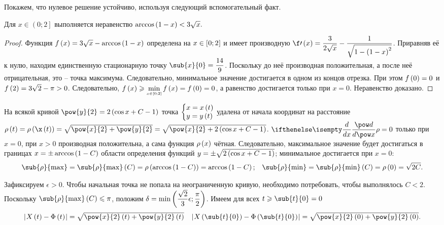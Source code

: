 \documentclass[a5paper,10pt]{article}
\begin{document}
Покажем, что нулевое решение устойчиво, используя следующий вспомогательный факт.

\begin{framed}
Для $x \in \left(0; 2\right]$ выполняется неравенство $\arccos\left(\hspace{0.01em}1 - x\hspace{0.01em}\right) < 3\sqrt{x}.$
\begin{proof}
    Функция $f\left(\hspace{0.01em}x\hspace{0.01em}\right) = 3\sqrt{x} - \arccos\left(\hspace{0.01em}1 - x\hspace{0.01em}\right)$ определена на $x \in \left[\hspace{0.03em}0; 2\hspace{0.03em}\right]$ и
    имеет производную 
    $\f\prime\br{x} = \dfrac {3} {2\sqrt{x}} - \dfrac {1} {\sqrt{1 - \br{1 - x}^2}}$.
    Приравняв её к нулю, находим единственную стационарную точку $\sub{x}{0} = \dfrac {14} {9}$.
    Поскольку до неё производная положительная, а после неё отрицательная,
    это -- точка максимума. Следовательно, минимальное значение достигается в одном из 
    концов отрезка. При этом 
    $f\left(\hspace{0.01em}0\hspace{0.01em}\right) = 0$ и $f\left(\hspace{0.01em}2\hspace{0.01em}\right) = 3\sqrt{2} - \pi > 0$.
    Следовательно, 
    $f\br{x} \ge \displaystyle{\tmin{\mathsmaller{x \in \rbr[0em]{0; 2}}}} {\,f\br{x}} = f\br{0} = 0$,
    а равенство достигается только при $x = 0$. Неравенство доказано.
\end{proof}
\end{framed}

На всякой кривой $\pow{y}{2} = 2\br{\cos x + C - 1}$ точка 
$\tsys{x = x\br{t} \\ y = y\br{t}}$
удалена от начала координат на расстояние 
$\rho\br{t} = \rho\br{\x\br{t}} = \sqrt{\pow{x}{2} + \pow{y}{2}} 
    = \sqrt{\pow{x}{2} + 2\br{\cos{x} + C - 1}}$.
$\der{}{x} \rho = 0$ только при $x = 0$, при $x > 0$ производная положительна, 
а сама функция $\rho\left(\hspace{0.01em}x\hspace{0.01em}\right)$ чётная. Следовательно, максимальное значение будет достигаться 
в границах $x = \pm \arccos\left(\hspace{0.01em}1 - C\hspace{0.01em}\right)$ области определения функций 
$y = \pm \sqrt{2\left(\hspace{0.01em}\cos{x} + C - 1\hspace{0.01em}\right)}$; минимальное достигается при $x = 0$:
\begin{align*}
    \sub{\rho}{\max}
        = \sub{\rho}{\max}\br{C}
        = \rho\br{\arccos\br{1 - C}} 
        = \arccos\br{1 - C}; 
    && \sub{\rho}{\min}
        = \sub{\rho}{\min}\br{C}
        = \rho\br{0} 
        = \sqrt{2C}.
\end{align*}

Зафиксируем $\epsilon > 0$. Чтобы начальная точка не попала на неограниченную кривую,
необходимо потребовать, чтобы выполнялось $C < 2$. 
Поскольку $\sub{\rho}{\max}\br{C} \le \pi$, положим
$\delta = \min\left(\hspace{0.01em}\dfrac {\sqrt{2}} {3} \epsilon; \dfrac {\pi} {2}\hspace{0.01em}\right)$.
Имеем для всех $t \ge \sub{t}{0} = 0$
\begin{align*}
    \vbr{X\br{t} - \Phi\br{t}} = \textstyle\sqrt{\pow{x}{2}\br{t} + \pow{y}{2}\br{t}}
    && \vbr{X\br{\sub{t}{0}} - \Phi\br{\sub{t}{0}}} 
        = \textstyle\sqrt{\pow{x}{2}\br{0} + \pow{y}{2}\br{0}}.
\end{align*}
\end{document}
